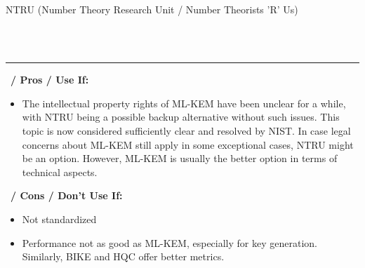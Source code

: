 \begin{algorithmbox}{NTRU (Number Theory Research Unit / Number Theorists 'R' Us)}
\begin{minipage}[t]{0.6\textwidth}
\begin{tabular}[t]{c c  c  c  c  c}
        \end{tabular}
    \end{minipage}\\[\baselineskip]
    \hrule
    \vspace{1\baselineskip}
    \begin{minipage}[t]{0.49\textwidth}
        \scriptsize\faThumbsUp\, {\bfseries / Pros / Use If:}
        \begin{itemize}[leftmargin=*]
            \setlength\itemsep{0em}
            \item The intellectual property rights of ML-KEM have been unclear for a while, with NTRU being a possible backup alternative without such issues. This topic is now considered sufficiently clear and resolved by NIST. In case legal concerns about ML-KEM still apply in some exceptional cases, NTRU might be an option. However, ML-KEM is usually the better option in terms of technical aspects.
        \end{itemize}
    \end{minipage}
    \hfill
    \begin{minipage}[t]{0.49\textwidth}
        \scriptsize \faThumbsDown\, {\bfseries / Cons / Don't Use If:}
        \begin{itemize}[leftmargin=*]
            \setlength\itemsep{0em}
            \item Not standardized
            \item Performance not as good as ML-KEM, especially for key generation. Similarly, BIKE and HQC offer better metrics.
        \end{itemize}
    \end{minipage}
\end{algorithmbox}
